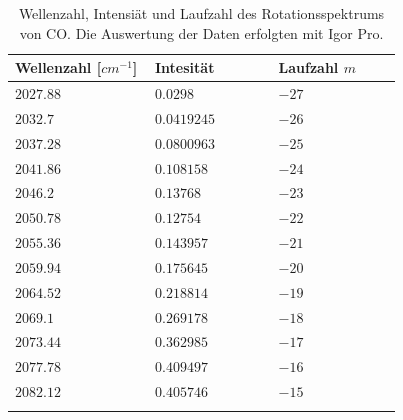 \begin{table}[H]
\centering

	\caption{Wellenzahl, Intensiät und Laufzahl des Rotationsspektrums von CO. Die Auswertung der Daten erfolgten mit Igor Pro. }
	\begin{tabular}{C{0.15\linewidth}|C{0.15\linewidth}|C{0.15\linewidth}}
		Wellenzahl [$cm^{-1}$] & Intesität & Laufzahl $m$\\
		\hline \addlinespace[1ex] 
$2027.88$&	$0.0298$&	$-27$\\
$2032.7$&	$0.0419245$&	$-26$\\
$2037.28$&	$0.0800963$&	$-25$\\
$2041.86$&	$0.108158$&	$-24$\\
$2046.2$&	$0.13768$&	$-23$\\
$2050.78$&	$0.12754$&	$-22$\\
$2055.36$&	$0.143957$&	$-21$\\
$2059.94$&	$0.175645$&	$-20$\\
$2064.52$&	$0.218814$&	$-19$\\
$2069.1$&	$0.269178$&	$-18$\\
$2073.44$&	$0.362985$&	$-17$\\
$2077.78$&	$0.409497$&	$-16$\\
$2082.12$&	$0.405746$&	$-15$\\
\label{Tabelle}
	\end{tabular}
\end{table}
